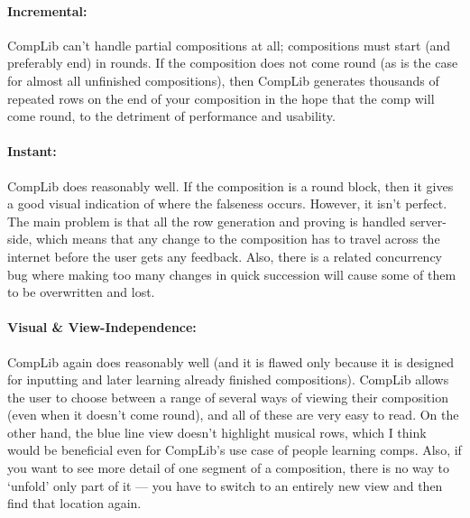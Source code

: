 \documentclass[12pt]{article}
\begin{document}
\paragraph{Incremental:}  CompLib can't handle partial compositions at all; compositions must start
(and preferably end) in rounds.  If the composition does not come round (as is the case for almost
all unfinished compositions), then CompLib generates thousands of repeated rows on the end of your
composition in the hope that the comp will come round, to the detriment of performance and
usability.

\paragraph{Instant:}  CompLib does reasonably well.  If the composition is a round block, then it
gives a good visual indication of where the falseness occurs.  However, it isn't perfect.  The main
problem is that all the row generation and proving is handled server-side, which means that any
change to the composition has to travel across the internet before the user gets any feedback.
Also, there is a related concurrency bug where making too many changes in quick succession will
cause some of them to be overwritten and lost.

\paragraph{Visual \& View-Independence:}  CompLib again does reasonably well (and it is flawed only
because it is designed for inputting and later learning already finished compositions).
CompLib allows the user to choose between a range of several ways of viewing their composition (even
when it doesn't come round), and all of these are very easy to read.  On the other hand, the
blue line view doesn't highlight musical rows, which I think would be beneficial even for CompLib's
use case of people learning comps.  Also, if you want to see more detail of one segment of a
composition, there is no way to `unfold' only part of it --- you have to switch to an entirely new
view and then find that location again.
\end{document}
